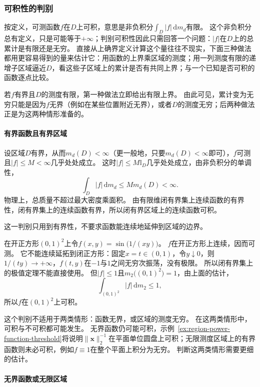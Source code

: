 \subsubsection{可积性的判别}

按定义，可测函数$f$在$D$上可积，意思是非负积分$\int_D|f|\,\mathrm dm_d$有限。
这个非负积分总有定义，只是可能等于$+\infty$；判别可积性因此只需回答一个问题：$|f|$在$D$上的总累计是有限还是无穷。
直接从上确界定义计算这个量往往不现实，下面三种做法都用更容易得到的量来估计它：用函数的上界乘区域的测度；用一列测度有限的递增子区域逼近$D$，看这些子区域上的累计是否有共同上界；与一个已知是否可积的函数逐点比较。

若$f$有界且$D$的测度有限，第一种做法立即给出有限上界。
由此可见，累计变为无穷只能是因为$f$无界（例如在某些位置附近无界），或者$D$的测度无穷；后两种做法正是为这两种情形准备的。

\paragraph{有界函数且有界区域}

设区域$D$有界，从而$m_d(D)<\infty$（更一般地，只要$m_d(D)<\infty$即可），$f$可测且$|f|\leq M<\infty$几乎处处成立。
这时$|f|\leq M\mathbb I_D$几乎处处成立，由非负积分的单调性，
\[
 \int_D|f|\,\mathrm dm_d\leq M m_d(D)<\infty.
\]
物理上，总质量不超过最大密度乘面积。
由有限维闭有界集上连续函数的有界性，闭有界集上的连续函数有界，所以闭有界区域上的连续函数可积。

这一判别只用到有界性，不要求函数能连续地延伸到区域的边界。
\begin{example}[开正方形上剧烈振荡的有界函数可积]
\label{ex:region-bounded-oscillation}
在开正方形$(0,1)^2$上令$f(x,y)=\sin\bigl(1/(xy)\bigr)$。
$f$在开正方形上连续，因而可测。
它不能连续延拓到闭正方形：固定$x=t\in(0,1)$，令$y\downarrow0$，则$1/(ty)\to+\infty$，$f(t,y)$在$-1$与$1$之间无穷次振荡，没有极限。
所以闭有界集上的极值定理不能直接使用。
但$|f|\leq1$且$m_2\bigl((0,1)^2\bigr)=1$，由上面的估计，
\[
 \int_{(0,1)^2}|f|\,\mathrm dm_2\leq1,
\]
所以$f$在$(0,1)^2$上可积。
\end{example}

这个判别不适用于两类情形：函数无界，或区域的测度无穷。
在这两类情形中，可积与不可积都可能发生。
无界函数仍可能可积，示例~\ref{ex:region-power-function-threshold}将说明$\lVert\bm x\rVert_2^{-1}$在平面单位圆盘上可积；无限测度区域上的有界函数则未必可积，例如$f\equiv1$在整个平面上积分为无穷。
判断这两类情形需要更细的估计。

\paragraph{无界函数或无限区域}

